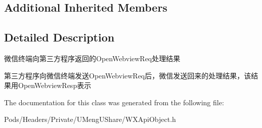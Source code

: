\subsection*{Additional Inherited Members}


\subsection{Detailed Description}
微信终端向第三方程序返回的\+Open\+Webview\+Req处理结果 

第三方程序向微信终端发送\+Open\+Webview\+Req后，微信发送回来的处理结果，该结果用\+Open\+Webview\+Resp表示 

The documentation for this class was generated from the following file\+:\begin{DoxyCompactItemize}
\item 
Pods/\+Headers/\+Private/\+U\+Meng\+U\+Share/W\+X\+Api\+Object.\+h\end{DoxyCompactItemize}
